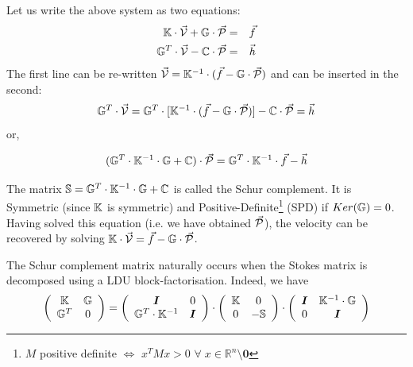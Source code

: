 
Let us write the above system as two equations:
\begin{eqnarray}
{\mathbb{K}} \cdot \vec{\cal V} + {\mathbb{G}} \cdot \vec{\cal P} &=& \vec{f} \\
{\mathbb{G}}^T \cdot  \vec{\cal V} - {\mathbb{C}} \cdot \vec{\cal P} &=& \vec{h} 
\end{eqnarray}
The first line can be re-written 
$\vec{\cal V}={\mathbb{K}}^{-1}\cdot (\vec{f} - {\mathbb{G}} \cdot \vec{\cal P})$ and can be inserted in the second:
\begin{equation}
{\mathbb{G}}^T\cdot \vec{\cal V} ={\mathbb{G}}^T \cdot  [ {\mathbb{K}}^{-1} \cdot  (\vec{f} - {\mathbb{G}} \cdot  \vec{\cal P}) ] - {\mathbb{C}}\cdot \vec{\cal P} = \vec{h} 
\end{equation}
or, 
\begin{mdframed}[backgroundcolor=blue!5]
\begin{equation}
({\mathbb{G}}^T \cdot {\mathbb{K}}^{-1} \cdot {\mathbb{G}} + {\mathbb{C}}) \cdot \vec{\cal P} = {\mathbb{G}}^T \cdot {\mathbb{K}}^{-1}\cdot \vec{f} - \vec{h} 
\end{equation}
\end{mdframed}
The matrix ${\mathbb{S}}= {\mathbb{G}}^T \cdot {\mathbb{K}}^{-1} \cdot {\mathbb{G}} + {\mathbb{C}}$ is called the Schur complement. 
It is Symmetric (since ${\mathbb{K}}$ is symmetric) and  Positive-Definite\footnote{$M$ 
positive definite $\iff$ $x^TMx>0$ $\forall \; x\in \mathbb{R}^n \setminus {\bm 0}$ }
(SPD)  if $Ker({{\mathbb{G}}})=0$. 
Having solved this equation (i.e. we have obtained $\vec{\cal P}$), the velocity can be recovered by solving 
${\mathbb{K}}\cdot \vec{\cal V} =\vec{f}- {\mathbb{G}} \cdot \vec{\cal P}$. 

\begin{remark}
The Schur complement matrix naturally occurs when the Stokes matrix is decomposed using 
a LDU block-factorisation. Indeed, we have 
\[
\left(
\begin{array}{cc}
{\mathbb{K}} & {\mathbb{G}} \\ 
{\mathbb{G}}^T & 0
\end{array}
\right)
=
\left(
\begin{array}{cc}
{\bm I} & 0 \\ 
{\mathbb{G}}^T \cdot {\mathbb{K}}^{-1} & {\bm I}
\end{array}
\right)
\cdot
\left(
\begin{array}{cc}
{\mathbb{K}} & 0 \\ 
0 & -{\mathbb{S}}
\end{array}
\right)
\cdot
\left(
\begin{array}{cc}
{\bm I} & {\mathbb{K}}^{-1} \cdot {\mathbb{G}} \\ 
0 & {\bm I}
\end{array}
\right)
\]
\end{remark}

